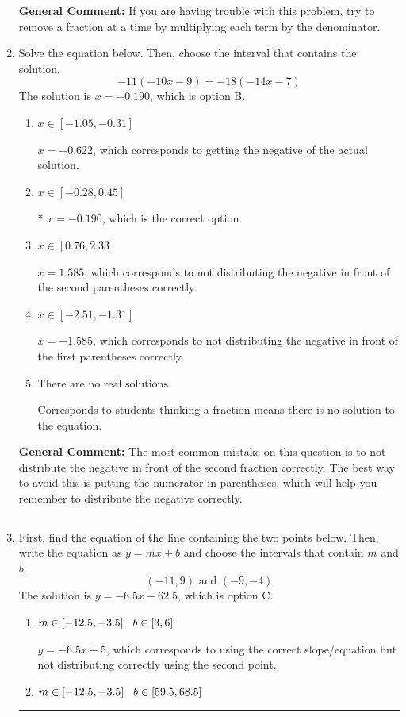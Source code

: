 \documentclass{extbook}[14pt]
\newcommand{\litem}[1]{\item #1

\rule{\textwidth}{0.4pt}}
\begin{document}
\begin{enumerate}
{\textbf{General Comment:} If you are having trouble with this problem, try to remove a fraction at a time by multiplying each term by the denominator.
}
\litem{
Solve the equation below. Then, choose the interval that contains the solution.
\[ -11(-10x -9) = -18(-14x -7) \]The solution is \( x = -0.190 \), which is option B.\begin{enumerate}[label=\Alph*.]
\item \( x \in [-1.05, -0.31] \)

$x = -0.622$, which corresponds to getting the negative of the actual solution.
\item \( x \in [-0.28, 0.45] \)

* $x = -0.190$, which is the correct option.
\item \( x \in [0.76, 2.33] \)

$x = 1.585$, which corresponds to not distributing the negative in front of the second parentheses correctly.
\item \( x \in [-2.51, -1.31] \)

$x = -1.585$, which corresponds to not distributing the negative in front of the first parentheses correctly.
\item \( \text{There are no real solutions.} \)

Corresponds to students thinking a fraction means there is no solution to the equation.
\end{enumerate}

\textbf{General Comment:} The most common mistake on this question is to not distribute the negative in front of the second fraction correctly. The best way to avoid this is putting the numerator in parentheses, which will help you remember to distribute the negative correctly.
}
\litem{
First, find the equation of the line containing the two points below. Then, write the equation as $ y=mx+b $ and choose the intervals that contain $m$ and $b$.
\[ (-11, 9) \text{ and } (-9, -4) \]The solution is \( y = -6.5x -62.5 \), which is option C.\begin{enumerate}[label=\Alph*.]
\item \( m \in [-12.5, -3.5] \hspace*{3mm} b \in [3, 6] \)

 $y = -6.5x + 5$, which corresponds to using the correct slope/equation but not distributing correctly using the second point.
\item \( m \in [-12.5, -3.5] \hspace*{3mm} b \in [59.5, 68.5] \)


\end{enumerate}}
\end{enumerate}
\end{document}
